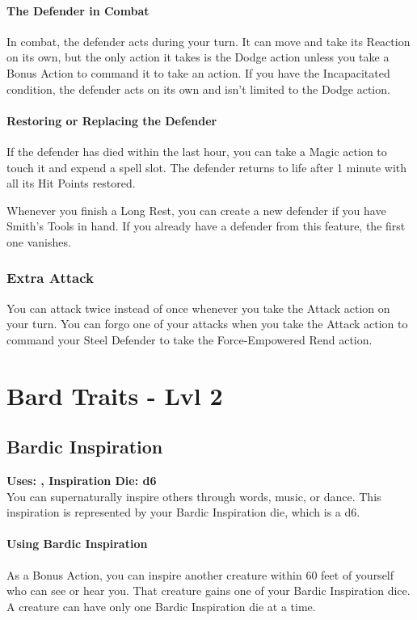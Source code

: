 \documentclass[letterpaper,openany,oneside,twocolumn]{book}
\begin{document}
\paragraph*{The Defender in Combat} In combat, the defender acts during your turn. It can move and take its Reaction on its own, but the only action it takes is the Dodge action unless you take a Bonus Action to command it to take an action. If you have the Incapacitated condition, the defender acts on its own and isn't limited to the Dodge action.
\paragraph*{Restoring or Replacing the Defender} If the defender has died within the last hour, you can take a Magic action to touch it and expend a spell slot. The defender returns to life after 1 minute with all its Hit Points restored.

Whenever you finish a Long Rest, you can create a new defender if you have Smith's Tools in hand. If you already have a defender from this feature, the first one vanishes.
\subsubsection*{Extra Attack}
You can attack twice instead of once whenever you take the Attack action on your turn. You can forgo one of your attacks when you take the Attack action to command your Steel Defender to take the Force-Empowered Rend action.
\vfill\eject
\section*{Bard Traits - Lvl 2} %
\subsection*{Bardic Inspiration}
\textbf{Uses: , Inspiration Die: d6}\\
You can supernaturally inspire others through words, music, or dance. This inspiration is represented by your Bardic Inspiration die, which is a d6.
\paragraph*{Using Bardic Inspiration} As a Bonus Action, you can inspire another creature within 60 feet of yourself who can see or hear you. That creature gains one of your Bardic Inspiration dice. A creature can have only one Bardic Inspiration die at a time.
\end{document}
